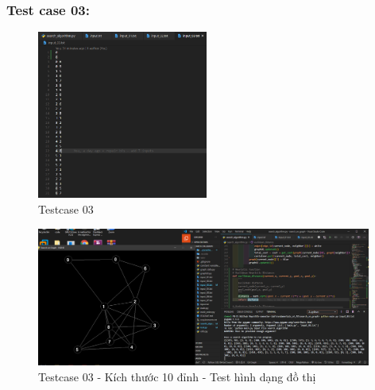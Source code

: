 \documentclass{article}
\begin{document}
\subsubsection{Test case 03:}
\begin{figure}[H]
\centering
\includegraphics[width=0.5\textwidth]{Test_Case_03_Content.png}
\caption{Testcase 03}
\end{figure}
\begin{figure}[H]
\centering
\includegraphics[width=0.98\textwidth]{Test_Case_03.png}
\caption{Testcase 03 - Kích thước 10 đỉnh - Test hình dạng đồ thị}
\end{figure}
\end{document}
